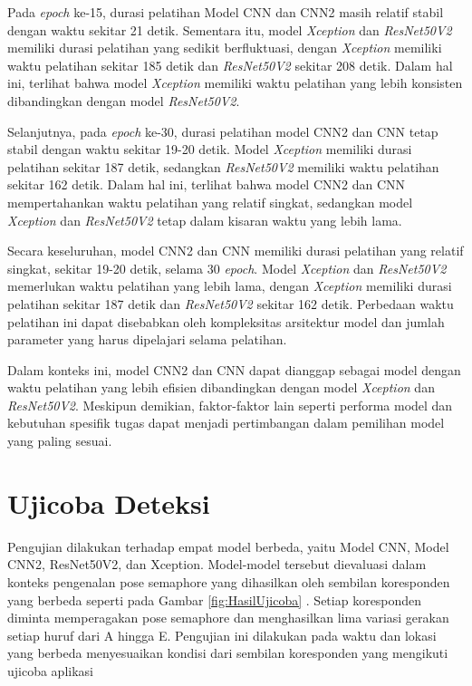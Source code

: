 Pada \textit{epoch} ke-15, durasi pelatihan Model CNN dan CNN2 masih relatif stabil dengan waktu sekitar 21 detik. Sementara itu, model \textit{Xception} dan \textit{ResNet50V2} memiliki durasi pelatihan yang sedikit berfluktuasi, dengan \textit{Xception} memiliki waktu pelatihan sekitar 185 detik dan \textit{ResNet50V2} sekitar 208 detik. Dalam hal ini, terlihat bahwa model \textit{Xception} memiliki waktu pelatihan yang lebih konsisten dibandingkan dengan model \textit{ResNet50V2}.

Selanjutnya, pada \textit{epoch} ke-30, durasi pelatihan model CNN2 dan CNN tetap stabil dengan waktu sekitar 19-20 detik. Model \textit{Xception} memiliki durasi pelatihan sekitar 187 detik, sedangkan \textit{ResNet50V2} memiliki waktu pelatihan sekitar 162 detik. Dalam hal ini, terlihat bahwa model CNN2 dan CNN mempertahankan waktu pelatihan yang relatif singkat, sedangkan model \textit{Xception} dan \textit{ResNet50V2} tetap dalam kisaran waktu yang lebih lama.

Secara keseluruhan, model CNN2 dan CNN memiliki durasi pelatihan yang relatif singkat, sekitar 19-20 detik, selama 30 \textit{epoch}. Model \textit{Xception} dan \textit{ResNet50V2} memerlukan waktu pelatihan yang lebih lama, dengan \textit{Xception} memiliki durasi pelatihan sekitar 187 detik dan \textit{ResNet50V2} sekitar 162 detik. Perbedaan waktu pelatihan ini dapat disebabkan oleh kompleksitas arsitektur model dan jumlah parameter yang harus dipelajari selama pelatihan.

Dalam konteks ini, model CNN2 dan CNN dapat dianggap sebagai model dengan waktu pelatihan yang lebih efisien dibandingkan dengan model \textit{Xception} dan \textit{ResNet50V2}. Meskipun demikian, faktor-faktor lain seperti performa model dan kebutuhan spesifik tugas dapat menjadi pertimbangan dalam pemilihan model yang paling sesuai.

\section{Ujicoba Deteksi}
Pengujian dilakukan terhadap empat model berbeda, yaitu Model CNN, Model CNN2, ResNet50V2, dan Xception. Model-model tersebut dievaluasi dalam konteks pengenalan pose semaphore yang dihasilkan oleh sembilan koresponden yang berbeda seperti pada Gambar \ref{fig:HasilUjicoba} . Setiap koresponden diminta memperagakan pose semaphore dan menghasilkan lima variasi gerakan setiap huruf dari A hingga E. Pengujian ini dilakukan pada waktu dan lokasi yang berbeda menyesuaikan kondisi dari sembilan koresponden yang mengikuti ujicoba aplikasi 

